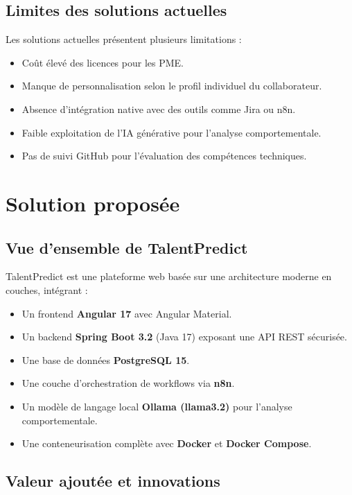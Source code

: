 \documentclass[12pt,a4paper]{report}
\begin{document}
\subsection{Limites des solutions actuelles}

Les solutions actuelles présentent plusieurs limitations :
\begin{itemize}
  \item Coût élevé des licences pour les PME.
  \item Manque de personnalisation selon le profil individuel du collaborateur.
  \item Absence d'intégration native avec des outils comme Jira ou n8n.
  \item Faible exploitation de l'IA générative pour l'analyse comportementale.
  \item Pas de suivi GitHub pour l'évaluation des compétences techniques.
\end{itemize}

\section{Solution proposée}

\subsection{Vue d'ensemble de TalentPredict}

TalentPredict est une plateforme web basée sur une architecture moderne en couches, intégrant :
\begin{itemize}
  \item Un frontend \textbf{Angular 17} avec Angular Material.
  \item Un backend \textbf{Spring Boot 3.2} (Java 17) exposant une API REST sécurisée.
  \item Une base de données \textbf{PostgreSQL 15}.
  \item Une couche d'orchestration de workflows via \textbf{n8n}.
  \item Un modèle de langage local \textbf{Ollama (llama3.2)} pour l'analyse comportementale.
  \item Une conteneurisation complète avec \textbf{Docker} et \textbf{Docker Compose}.
\end{itemize}

\subsection{Valeur ajoutée et innovations}
\end{document}
